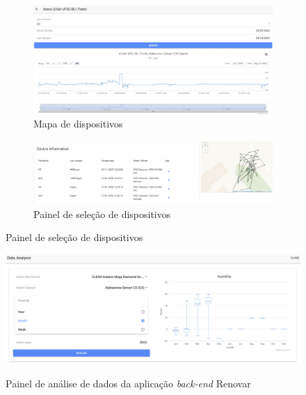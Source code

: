 \begin{figure}[h]
    \centering
    \caption{Painéis da aplicação \textit{front-end} de Renovar}
    \begin{subfigure}{0.495\textwidth}
        \includegraphics[width=\textwidth]{chapters/2-CLEAN/Figuras/ Renovar time series panel.jpg}
        \caption{Mapa de dispositivos}
        \label{fig:renovar-series-2}
    \end{subfigure}
    \hfill
    \begin{subfigure}{0.495\textwidth}
        \includegraphics[width=\textwidth]{chapters/2-CLEAN/Figuras/Renovar portable map.png}
        \caption{Painel de seleção de dispositivos}
        \label{fig:renovar-portable-map}
    \end{subfigure}
    \hfill
    \label{fig:renovar-series-and-map}
\end{figure}

\begin{figure}[h]
    \centering
    \caption{Painel de análise de dados da aplicação \textit{back-end} Renovar}
    \includegraphics[width=0.80\linewidth]{chapters//2-CLEAN/Figuras/Renovar Data Analysis Panel.png}
    \label{fig:renovar-data-analysis}
\end{figure}
